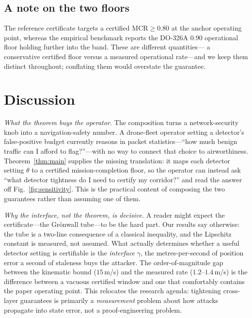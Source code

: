 \documentclass[conference]{IEEEtran}
\newcommand{\MCR}{\mathrm{MCR}}
\begin{document}
\subsection{A note on the two floors}
The reference certificate targets a certified $\MCR\ge 0.80$ at the anchor
operating point, whereas the empirical benchmark reports the DO-326A $0.90$
operational floor holding further into the band. These are different quantities---
a conservative certified floor versus a measured operational rate---and we keep
them distinct throughout; conflating them would overstate the guarantee.

\section{Discussion}
\label{sec:discussion}
\emph{What the theorem buys the operator.} The composition turns a
network-security knob into a navigation-safety number. A drone-fleet operator
setting a detector's false-positive budget currently reasons in packet
statistics---``how much benign traffic can I afford to flag?''---with no way to
connect that choice to airworthiness. Theorem~\ref{thm:main} supplies the
missing translation: it maps each detector setting $\theta$ to a certified
mission-completion floor, so the operator can instead ask ``what detector
tightness do I need to certify my corridor?'' and read the answer off
Fig.~\ref{fig:sensitivity}. This is the practical content of composing the two
guarantees rather than assuming one of them.

\emph{Why the interface, not the theorem, is decisive.} A reader might expect
the certificate---the Grönwall tube---to be the hard part. Our results say
otherwise: the tube is a two-line consequence of a classical inequality, and the
Lipschitz constant is measured, not assumed. What actually determines whether a
useful detector setting is certifiable is the \emph{interface} $\gamma$, the
metres-per-second of position error a second of staleness buys the attacker. The
order-of-magnitude gap between the kinematic bound ($15$\,m/s) and the measured
rate ($1.2$--$1.4$\,m/s) is the difference between a vacuous certified window and
one that comfortably contains the paper operating point. This relocates the
research agenda: tightening cross-layer guarantees is primarily a
\emph{measurement} problem about how attacks propagate into state error, not a
proof-engineering problem.
\end{document}
